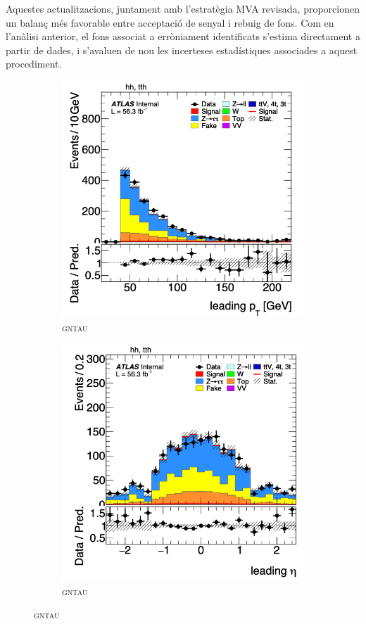 Aquestes actualitzacions, juntament amb l’estratègia MVA revisada, proporcionen un balanç més favorable entre acceptació de senyal i rebuig de fons.  
Com en l’anàlisi anterior, el fons associat a \tauhad erròniament identificats s’estima directament a partir de dades, i s’avaluen de nou les incerteses estadístiques associades a aquest procediment.
\begin{figure}[htbp]
  \centering
  \begin{subfigure}[b]{0.45\textwidth}
      \centering
      \includegraphics[width=\textwidth]{images/leading_pt_gntau.png}
      \caption{\textsc{gntau}}
  \end{subfigure}
  \begin{subfigure}[b]{0.45\textwidth}
      \centering
      \includegraphics[width=\textwidth]{images/leading_eta_gntau.png}
      \caption{\textsc{gntau}}
  \end{subfigure}


\end{figure}
